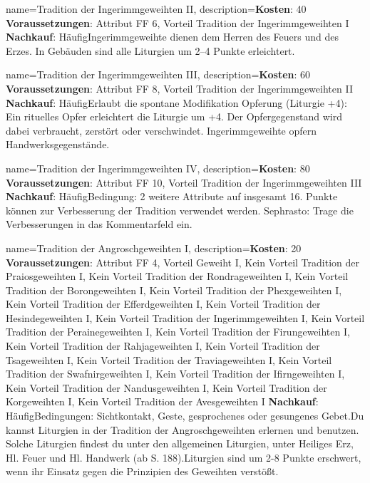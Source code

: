 {
    name={Tradition der Ingerimmgeweihten II},
    description={\textbf{Kosten}: 40 \textbf{Voraussetzungen}: Attribut FF 6, Vorteil Tradition der Ingerimmgeweihten I \textbf{Nachkauf}: Häufig\newline Ingerimmgeweihte dienen dem Herren des Feuers und des Erzes. In Gebäuden sind alle Liturgien um 2–4 Punkte erleichtert.}
}


{
    name={Tradition der Ingerimmgeweihten III},
    description={\textbf{Kosten}: 60 \textbf{Voraussetzungen}: Attribut FF 8, Vorteil Tradition der Ingerimmgeweihten II \textbf{Nachkauf}: Häufig\newline Erlaubt die spontane Modifikation Opferung (Liturgie +4): Ein rituelles Opfer erleichtert die Liturgie um +4. Der Opfergegenstand wird dabei verbraucht, zerstört oder verschwindet. Ingerimmgeweihte opfern Handwerksgegenstände.}
}


{
    name={Tradition der Ingerimmgeweihten IV},
    description={\textbf{Kosten}: 80 \textbf{Voraussetzungen}: Attribut FF 10, Vorteil Tradition der Ingerimmgeweihten III \textbf{Nachkauf}: Häufig\newline Bedingung: 2 weitere Attribute auf insgesamt 16. Punkte können zur Verbesserung der Tradition verwendet werden. Sephrasto: Trage die Verbesserungen in das Kommentarfeld ein.}
}


{
    name={Tradition der Angroschgeweihten I},
    description={\textbf{Kosten}: 20 \textbf{Voraussetzungen}: Attribut FF 4, Vorteil Geweiht I, Kein Vorteil Tradition der Praiosgeweihten I, Kein Vorteil Tradition der Rondrageweihten I, Kein Vorteil Tradition der Borongeweihten I, Kein Vorteil Tradition der Phexgeweihten I, Kein Vorteil Tradition der Efferdgeweihten I, Kein Vorteil Tradition der Hesindegeweihten I, Kein Vorteil Tradition der Ingerimmgeweihten I, Kein Vorteil Tradition der Perainegeweihten I, Kein Vorteil Tradition der Firungeweihten I, Kein Vorteil Tradition der Rahjageweihten I, Kein Vorteil Tradition der Tsageweihten I, Kein Vorteil Tradition der Traviageweihten I, Kein Vorteil Tradition der Swafnirgeweihten I, Kein Vorteil Tradition der Ifirngeweihten I, Kein Vorteil Tradition der Nandusgeweihten I, Kein Vorteil Tradition der Korgeweihten I, Kein Vorteil Tradition der Avesgeweihten I \textbf{Nachkauf}: Häufig\newline Bedingungen: Sichtkontakt, Geste, gesprochenes oder gesungenes Gebet.\newline Du kannst Liturgien in der Tradition der Angroschgeweihten erlernen und benutzen. Solche Liturgien findest du unter den allgemeinen Liturgien, unter Heiliges Erz, Hl. Feuer und Hl. Handwerk (ab S. 188).\newline Liturgien sind um 2-8 Punkte erschwert, wenn ihr Einsatz gegen die Prinzipien des Geweihten verstößt.}
}


